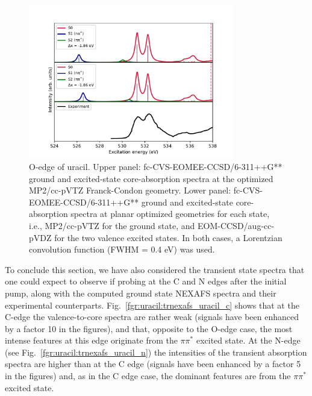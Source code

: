 \documentclass[journal=jctcce,manuscript=article]{achemso}
\begin{document}
\begin{figure}[H]
\includegraphics[width=0.8\textwidth]{Spectra/MP2_Uracil_Sn_O.pdf}
\caption{O-edge of uracil. 
Upper panel: fc-CVS-EOMEE-CCSD/6-311++G** ground and excited-state core-absorption spectra at the optimized MP2/cc-pVTZ Franck-Condon geometry. 
Lower panel: fc-CVS-EOMEE-CCSD/6-311++G** ground and excited-state core-absorption spectra at planar optimized geometries for each state, i.e., MP2/cc-pVTZ for the ground state, and EOM-CCSD/aug-cc-pVDZ for the two valence excited states. In both cases,
a Lorentzian convolution function (FWHM = 0.4 eV) was used.
\label{fgr:uracil:trnexafs_uracil_o:MP2CCSD}}
\end{figure}

To conclude this section, we have also considered the transient state spectra that one could expect to observe if probing at the C and N edges after the initial pump, along with the computed ground state NEXAFS spectra and their experimental counterparts.  
Fig.~\ref{fgr:uracil:trnexafs_uracil_c} shows that at the C-edge the valence-to-core spectra
are rather weak (signals have been enhanced by a factor 10 in the figures),
and that, opposite to the O-edge case, 
the most intense features at this edge originate from the $\pi\pi^*$ excited state.
At the N-edge (see Fig.~\ref{fgr:uracil:trnexafs_uracil_n})
the intensities of the transient absorption spectra are higher than
at the C edge (signals have been enhanced by a factor 5 in the figures)
and, as in the C edge case, the dominant features are from 
the $\pi\pi^*$ excited state. 
\end{document}
